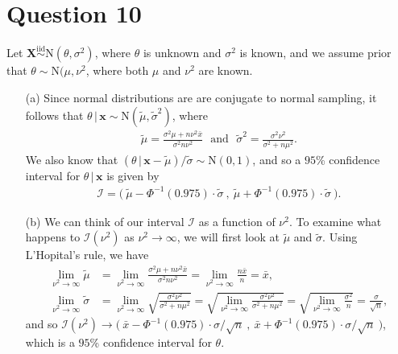\documentclass[10pt]{article}
\begin{document}
\section{Question 10} \noindent
Let \(\bm{X} \overset{\mathrm{iid}}{\sim} \mathrm{N}(\theta, \sigma^2)\), where \(\theta\) is unknown and \(\sigma^2\) is known, and we assume prior that 
\(\theta \sim \mathrm{N}(\mu, \nu^2\), where both \(\mu\) and \(\nu^2\) are known. 
\begin{itemize}
    \item[(a)] Since normal distributions are are conjugate to normal sampling, it follows
    that \(\theta \,|\, \mathbf{x} \sim \mathrm{N}(\tilde{\mu}, \tilde{\sigma}^2)\), where 
    \begin{align*}
        \tilde{\mu}
        = \frac{\sigma^2 \mu + n \nu^2 \bar{x}}{\sigma^2 n \nu^2}
        ~~~\text{and}~~~
        \tilde{\sigma}^2
        = \frac{\sigma^2 \nu^2}{\sigma^2 + n \mu^2}.
    \end{align*}
    We also know that \((\theta \,|\, \mathbf{x} - \tilde{\mu}) / \tilde{\sigma} \sim \mathrm{N}(0,1)\), and so a \(95\)\%{} confidence interval for 
    \(\theta \,|\, \mathbf{x}\) is given by 
    \begin{align*}
        \mathcal{I}
        = \Big( ~ \tilde{\mu} - \Phi^{-1}(0.975) \cdot \tilde{\sigma} ~,~ \tilde{\mu} + \Phi^{-1}(0.975) \cdot \tilde{\sigma} ~ \Big).
    \end{align*} 
    \item[(b)] We can think of our interval \(\mathcal{I}\) as a function of \(\nu^2\). To examine what happens to \(\mathcal{I}(\nu^2)\) as \(\nu^2 \to \infty\), we 
    will first look at \(\tilde{\mu}\) and \(\tilde{\sigma}\). Using L'Hopital's rule, we have
    \begin{align*}
        \lim_{\nu^2 \to \infty} \tilde{\mu}
        &= \lim_{\nu^2 \to \infty} \frac{\sigma^2 \mu + n \nu^2 \bar{x}}{\sigma^2 n \nu^2}
        = \lim_{\nu^2 \to \infty} \frac{n \bar{x}}{n}
        = \bar{x}, \\
        \lim_{\nu^2 \to \infty} \tilde{\sigma}
        &= \lim_{\nu^2 \to \infty} \sqrt{\frac{\sigma^2 \nu^2}{\sigma^2 + n \mu^2}}
        = \sqrt{ \lim_{\nu^2 \to \infty} \frac{\sigma^2 \nu^2}{\sigma^2 + n \mu^2}}
        = \sqrt{ \lim_{\nu^2 \to \infty} \frac{\sigma^2}{n}}
        = \frac{\sigma}{\sqrt{n}},
    \end{align*}
    and so \(\mathcal{I}(\nu^2) \to \big( ~\bar{x} - \Phi^{-1}(0.975) \cdot \sigma / \sqrt{n} ~,~ \bar{x} + \Phi^{-1}(0.975) \cdot \sigma / \sqrt{n} ~ \big)\),
    which is a \(95\)\%{} confidence interval for \(\theta\). 
\end{itemize}
\end{document}
